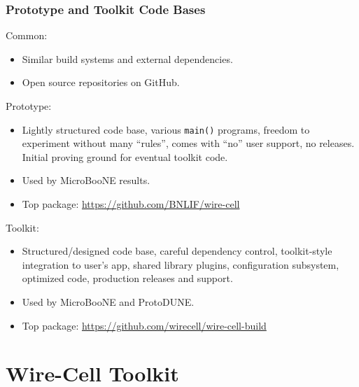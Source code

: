 \documentclass[xcolor=dvipsnames]{beamer}
\begin{document}
\begin{frame}
  \frametitle{Prototype and Toolkit Code Bases}
  Common:
  \begin{itemize}\footnotesize
  \item Similar build systems and external dependencies.
  \item Open source repositories on GitHub.
  \end{itemize}
  Prototype:
  \begin{itemize}\footnotesize
  \item Lightly structured code base, various \texttt{main()} programs, freedom to experiment without many ``rules'', comes with ``no'' user support, no releases.
    Initial proving ground for eventual toolkit code.
  \item Used by MicroBooNE results.
  \item Top package: \url{https://github.com/BNLIF/wire-cell}
  \end{itemize}
  Toolkit:
  \begin{itemize}\footnotesize
  \item Structured/designed code base, careful dependency control, toolkit-style integration to user's app, shared library plugins, configuration subsystem, optimized code, production releases and support.
  \item Used by MicroBooNE and ProtoDUNE.
  \item Top package: \url{https://github.com/wirecell/wire-cell-build}
  \end{itemize}
\end{frame}


\section{Wire-Cell Toolkit}
\begin{frame}
\end{frame}
\end{document}
